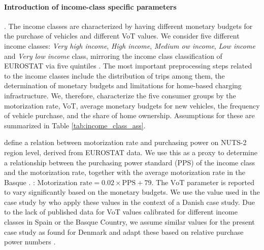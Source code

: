 \documentclass[preprint,review,11pt, authoryear]{elsarticle}
\begin{document}
        \paragraph*{Introduction of income-class specific parameters}
            
            . The income classes are characterized by having different monetary budgets for the purchase of vehicles and different VoT values. We consider five different income classes: \textit{Very high income}, \textit{High income}, \textit{Medium ow income}, \textit{Low income} and \textit{Very low income} class, mirroring the income class classification of EUROSTAT via five quintiles \citep{eurostat_icw_metadata}. The most important pre\deleted{-}processing steps related to the income classes include the distribution of trips among them, the determination of monetary budgets and limitations for home-based charging infrastructure. 
            We, therefore, characterize the five consumer groups by the motorization rate, VoT, average monetary budgets for new vehicles, the frequency of vehicle purchase, and the share of home ownership. Assumptions for these are summarized in Table \ref{tab:income_class_ass}.
            
            
            \citet{Mattioli2023} define a relation between motorization rate and purchasing power on NUTS-2 region level, derived from EUROSTAT data. 
            We use this as a proxy to determine a relationship between the purchasing power standard (PPS) of the income class and the motorization rate, together with the average motorization rate in the Basque . : $\textrm{Motorization rate} = 0.02 \times \textrm{PPS} + 79$.  The $\mathrm{VoT}$ parameter is reported to vary significantly based on the monetary budgets. We use the value used in the case study by \citet{TATTINI2018265} who apply these values in the context of a Danish case study. Due to the lack of published data for VoT values calibrated for different income classes in Spain or the Basque Country, we assume similar values for the present case study as found for Denmark and adapt these based on relative purchase power numbers \citep{Eurostat_ilc_di02_2025}.
            
\end{document}

